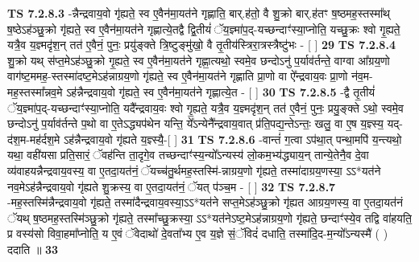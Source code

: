 \documentclass[17pt]{extarticle}
\begin{document}
                  \newline
                                \textbf{ TS 7.2.8.3} \newline
                  -न्नैन्द्रवाय॒वो गृ॑ह्यते॒ स्व ए॒वैन॑मा॒यत॑ने गृह्णाति॒ बार्.ह॑तो॒ वै शु॒क्रो बार्.ह॑तꣳ ष॒ष्ठमह॒स्तस्मा᳚थ् ष॒ष्ठेऽह॑ञ्छु॒क्रो गृ॑ह्यते॒ स्व ए॒वैन॑मा॒यत॑ने गृह्णात्ये॒तद्वै द्वि॒तीयं॑ ॅय॒ज्ञ्मा॑प॒द्-यच्छन्दाꣳ॑स्या॒प्नोति॒ यच्छु॒क्रः श्वो गृ॒ह्यते॒ यत्रै॒व य॒ज्ञ्मदृ॑श॒न् तत॑ ए॒वैनं॒ पुनः॒ प्रयु॑ङ्क्ते त्रि॒ष्टुङ्मु॑खो॒ वै तृ॒तीय॑स्त्रिरा॒त्रस्त्रैष्टु॑भः - [  ] \textbf{  29} \newline
                  \newline
                                \textbf{ TS 7.2.8.4} \newline
                  शु॒क्रो यथ् स॑प्त॒मेऽह॑ञ्छु॒क्रो गृ॒ह्यते॒ स्व ए॒वैन॑मा॒यत॑ने गृह्णा॒त्यथो॒ स्वमे॒व छन्दोऽनु॑ प॒र्याव॑र्तन्ते॒ वाग्वा आ᳚ग्रय॒णो वाग॑ष्ट॒ममह॒-स्तस्मा॑दष्ट॒मेऽह॑न्नाग्रय॒णो गृ॑ह्यते॒ स्व ए॒वैन॑मा॒यत॑ने गृह्णाति प्रा॒णो वा ऐ᳚न्द्रवाय॒वः प्रा॒णो न॑व॒म-मह॒स्तस्मा᳚न्नव॒मे ऽह॑न्नैन्द्रवाय॒वो गृ॑ह्यते॒ स्व ए॒वैन॑मा॒यत॑ने गृह्णात्ये॒त - [  ] \textbf{  30} \newline
                  \newline
                                \textbf{ TS 7.2.8.5} \newline
                  -द्वै तृ॒तीयं॑ ॅय॒ज्ञ्मा॑प॒द्-यच्छन्दाꣳ॑स्या॒प्नोति॒ यदै᳚न्द्रवाय॒वः श्वो गृ॒ह्यते॒ यत्रै॒व य॒ज्ञ्मदृ॑श॒न् तत॑ ए॒वैनं॒ पुनः॒ प्रयु॒ङ्क्ते ऽथो॒ स्वमे॒व छन्दोऽनु॑ प॒र्याव॑र्तन्ते प॒थो वा ए॒तेऽद्ध्यप॑थेन यन्ति॒ ये᳚ऽन्येनै᳚न्द्रवाय॒वात् प्र॑ति॒पद्य॒न्तेऽन्तः॒ खलु॒ वा ए॒ष य॒ज्ञ्स्य॒ यद्-द॑श॒म-मह॑र्दश॒मे ऽह॑न्नैन्द्रवाय॒वो गृ॑ह्यते य॒ज्ञ्स्यै॒-[  ] \textbf{  31} \newline
                  \newline
                                \textbf{ TS 7.2.8.6} \newline
                  -वान्तं॑ ग॒त्वा ऽप॑था॒त् पन्था॒मपि॑ य॒न्त्यथो॒ यथा॒ वही॑यसा प्रति॒सारं॒ ॅवह॑न्ति ता॒दृगे॒व तच्छन्दाꣳ॑स्य॒न्यो᳚ऽन्यस्य॑ लो॒कम॒भ्य॑द्ध्याय॒न् तान्ये॒तेनै॒व दे॒वा व्य॑वाहयन्नैन्द्रवाय॒वस्य॒ वा ए॒तदा॒यत॑नं॒ ॅयच्च॑तु॒र्थमह॒स्तस्मि॑-न्नाग्रय॒णो गृ॑ह्यते॒ तस्मा॑दाग्रय॒णस्या॒ ऽऽ*यत॑ने नव॒मेऽह॑न्नैन्द्रवाय॒वो गृ॑ह्यते शु॒क्रस्य॒ वा ए॒तदा॒यत॑नं॒ ॅयत् प॑ञ्च॒म - [  ] \textbf{  32} \newline
                  \newline
                                \textbf{ TS 7.2.8.7} \newline
                  -मह॒स्तस्मि॑न्नैन्द्रवाय॒वो गृ॑ह्यते॒ तस्मा॑दैन्द्रवाय॒वस्या॒ऽऽ*यत॑ने सप्त॒मेऽह॑ञ्छु॒क्रो गृ॑ह्यत आग्रय॒णस्य॒ वा ए॒तदा॒यत॑नं ॅयथ् ष॒ष्ठमह॒स्तस्मि॑ञ्छु॒क्रो गृ॑ह्यते॒ तस्मा᳚च्छु॒क्रस्या॒ ऽऽ*यत॑नेऽष्ट॒मेऽह॑न्नाग्रय॒णो गृ॑ह्यते॒ छन्दाꣳ॑स्ये॒व तद्वि वा॑हयति॒ प्र वस्य॑सो विवा॒हमा᳚प्नोति॒ य ए॒वं ॅवेदाथो॑ दे॒वता᳚भ्य ए॒व य॒ज्ञे सं॒ॅविदं॑ दधाति॒ तस्मा॑दि॒द-म॒न्यो᳚ऽन्यस्मै॑ ( ) ददाति ॥ \textbf{  33 } \newline
\end{document}
